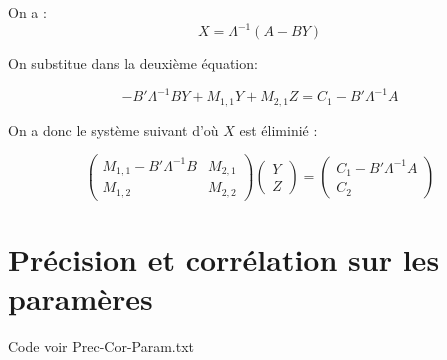 On a :
\begin{equation}
    X = \Lambda^{-1} (A-BY)
\end{equation}

On substitue  dans la deuxi\`eme \'equation:

\begin{equation}
        -B' \Lambda^{-1} BY  +  M_{1,1}Y +  M_{2,1} Z  = C_1 -B'\Lambda^{-1} A
\end{equation}

On a donc le syst\`eme suivant d'o\`u $X$ est \'elimini\'e :

\begin{equation}
 \begin{pmatrix}  
                   M_{1,1} -B' \Lambda^{-1} B & M_{2,1}  \\    
	           M_{1,2} &  M_{2,2}
  \end{pmatrix}
   \begin{pmatrix}  Y \\ Z \end{pmatrix}
   = \begin{pmatrix}  C_1 -B'\Lambda^{-1} A \\  C_2 \end{pmatrix}
\end{equation}


\section{Précision et corrélation sur les paramères}

Code voir Prec-Cor-Param.txt



